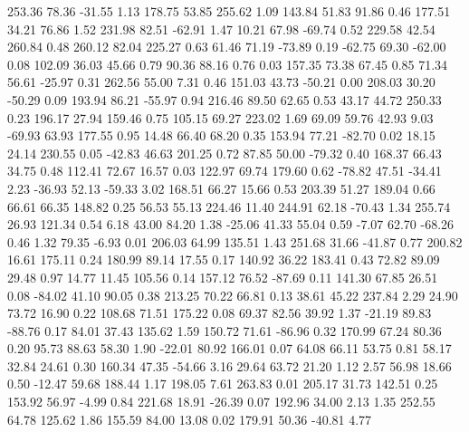  253.36   78.36  -31.55    1.13
  178.75   53.85  255.62    1.09
  143.84   51.83   91.86    0.46
  177.51   34.21   76.86    1.52
  231.98   82.51  -62.91    1.47
   10.21   67.98  -69.74    0.52
  229.58   42.54  260.84    0.48
  260.12   82.04  225.27    0.63
   61.46   71.19  -73.89    0.19
  -62.75   69.30  -62.00    0.08
  102.09   36.03   45.66    0.79
   90.36   88.16    0.76    0.03
  157.35   73.38   67.45    0.85
   71.34   56.61  -25.97    0.31
  262.56   55.00    7.31    0.46
  151.03   43.73  -50.21    0.00
  208.03   30.20  -50.29    0.09
  193.94   86.21  -55.97    0.94
  216.46   89.50   62.65    0.53
   43.17   44.72  250.33    0.23
  196.17   27.94  159.46    0.75
  105.15   69.27  223.02    1.69
   69.09   59.76   42.93    9.03
  -69.93   63.93  177.55    0.95
   14.48   66.40   68.20    0.35
  153.94   77.21  -82.70    0.02
   18.15   24.14  230.55    0.05
  -42.83   46.63  201.25    0.72
   87.85   50.00  -79.32    0.40
  168.37   66.43   34.75    0.48
  112.41   72.67   16.57    0.03
  122.97   69.74  179.60    0.62
  -78.82   47.51  -34.41    2.23
  -36.93   52.13  -59.33    3.02
  168.51   66.27   15.66    0.53
  203.39   51.27  189.04    0.66
   66.61   66.35  148.82    0.25
   56.53   55.13  224.46   11.40
  244.91   62.18  -70.43    1.34
  255.74   26.93  121.34    0.54
    6.18   43.00   84.20    1.38
  -25.06   41.33   55.04    0.59
   -7.07   62.70  -68.26    0.46
    1.32   79.35   -6.93    0.01
  206.03   64.99  135.51    1.43
  251.68   31.66  -41.87    0.77
  200.82   16.61  175.11    0.24
  180.99   89.14   17.55    0.17
  140.92   36.22  183.41    0.43
   72.82   89.09   29.48    0.97
   14.77   11.45  105.56    0.14
  157.12   76.52  -87.69    0.11
  141.30   67.85   26.51    0.08
  -84.02   41.10   90.05    0.38
  213.25   70.22   66.81    0.13
   38.61   45.22  237.84    2.29
   24.90   73.72   16.90    0.22
  108.68   71.51  175.22    0.08
   69.37   82.56   39.92    1.37
  -21.19   89.83  -88.76    0.17
   84.01   37.43  135.62    1.59
  150.72   71.61  -86.96    0.32
  170.99   67.24   80.36    0.20
   95.73   88.63   58.30    1.90
  -22.01   80.92  166.01    0.07
   64.08   66.11   53.75    0.81
   58.17   32.84   24.61    0.30
  160.34   47.35  -54.66    3.16
   29.64   63.72   21.20    1.12
    2.57   56.98   18.66    0.50
  -12.47   59.68  188.44    1.17
  198.05    7.61  263.83    0.01
  205.17   31.73  142.51    0.25
  153.92   56.97   -4.99    0.84
  221.68   18.91  -26.39    0.07
  192.96   34.00    2.13    1.35
  252.55   64.78  125.62    1.86
  155.59   84.00   13.08    0.02
  179.91   50.36  -40.81    4.77
